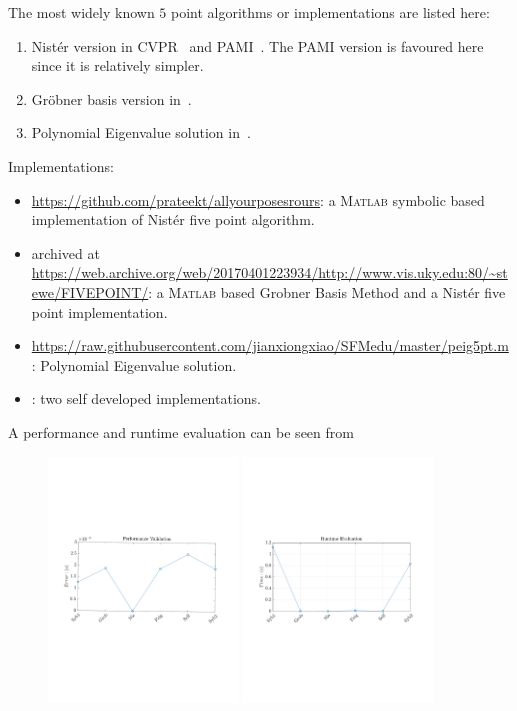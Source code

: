 The most widely known $5$ point algorithms or implementations are listed here:
\begin{enumerate}
\item Nist\'er version in CVPR~\cite{nister2003efficient} and PAMI~\cite{nister2004efficient}. The PAMI version is favoured here since it is relatively simpler.
\item Gr\"obner basis version in~\cite{stewenius2006recent}. 
\item Polynomial Eigenvalue solution in~\cite{kukelovapolynomial}.
\end{enumerate}
Implementations:
\begin{itemize}
\item \url{https://github.com/prateekt/allyourposesrours}: a \textsc{Matlab} symbolic based implementation of Nist\'er five point algorithm.
\item archived at \url{https://web.archive.org/web/20170401223934/http://www.vis.uky.edu:80/~stewe/FIVEPOINT/}: a \textsc{Matlab} based Grobner Basis Method and a Nist\'er five point implementation.
\item \url{https://raw.githubusercontent.com/jianxiongxiao/SFMedu/master/peig5pt.m}: Polynomial Eigenvalue solution.
\item: two self developed implementations.
\end{itemize}
A performance and runtime evaluation can be seen from
\begin{figure}
\centering
\includegraphics[width=0.45\textwidth]{hand_eye_files/vision/figures/five_point_perf}
\includegraphics[width=0.45\textwidth]{hand_eye_files/vision/figures/five_point_time}
\label{fig:ess_com}
\end{figure}
